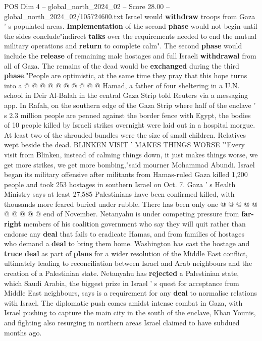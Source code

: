 \begin{textsample}{POS Dim 4 – global\_north\_2024\_02 – Score 28.00 – global\_north\_2024\_02/105724600.txt}
Israel would \textbf{withdraw} troops from Gaza ' s populated areas. \textbf{Implementation} of the second \textbf{phase} would not begin until the sides conclude"indirect \textbf{talks} over the requirements needed to end the mutual military operations and \textbf{return} to complete calm".
The second \textbf{phase} would include the \textbf{release} of remaining male hostages and full Israeli \textbf{withdrawal} from all of Gaza.
The remains of the dead would be \textbf{exchanged} during the third \textbf{phase}."People are optimistic, at the same time they pray that this hope turns into a @ @ @ @ @ @ @ @ @ @ Hamad, a father of four sheltering in a U.N. school in Deir Al-Balah in the central Gaza Strip told Reuters via a messaging app.
In Rafah, on the southern edge of the Gaza Strip where half of the enclave ' s 2.3 million people are penned against the border fence with Egypt, the bodies of 10 people killed by Israeli strikes overnight were laid out in a hospital morgue.
At least two of the shrouded bundles were the size of small children.
Relatives wept beside the dead.
BLINKEN VISIT ' MAKES THINGS WORSE '"Every visit from Blinken, instead of calming things down, it just makes things worse, we get more strikes, we get more bombing,"said mourner Mohammad Abundi.
Israel began its military offensive after militants from Hamas-ruled Gaza killed 1,200 people and took 253 hostages in southern Israel on Oct. 7.
Gaza ' s Health Ministry says at least 27,585 Palestinians have been confirmed killed, with thousands more feared buried under rubble.
There has been only one @ @ @ @ @ @ @ @ @ @ end of November.
Netanyahu is under competing pressure from \textbf{far-right} members of his coalition government who say they will quit rather than endorse any \textbf{deal} that fails to eradicate Hamas, and from families of hostages who demand a \textbf{deal} to bring them home.
Washington has cast the hostage and \textbf{truce} \textbf{deal} as part of \textbf{plans} for a wider resolution of the Middle East conflict, ultimately leading to reconciliation between Israel and Arab neighbours and the creation of a Palestinian state.
Netanyahu has \textbf{rejected} a Palestinian state, which Saudi Arabia, the biggest prize in Israel ' s quest for acceptance from Middle East neighbours, says is a requirement for any \textbf{deal} to normalise relations with Israel.
The diplomatic push comes amidst intense combat in Gaza, with Israel pushing to capture the main city in the south of the enclave, Khan Younis, and fighting also resurging in northern areas Israel claimed to have subdued months ago.

\end{textsample}
